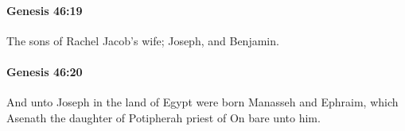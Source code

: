 		\paragraph{Genesis 46:19} %
			\label{GENESIS-46-19}

			The sons of Rachel Jacob's wife; Joseph, and Benjamin.


		\paragraph{Genesis 46:20} %
			\label{GENESIS-46-20}

			And unto Joseph in the land of Egypt were born Manasseh and Ephraim, which Asenath the daughter of Potipherah priest of On bare unto him.


